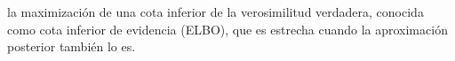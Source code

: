 \documentclass[../../book-main_es.tex]{subfiles}
\begin{document}
la maximización de una cota inferior de la verosimilitud verdadera, conocida como
cota inferior de evidencia (ELBO), que es estrecha cuando la aproximación posterior
también lo es.
\end{document}
